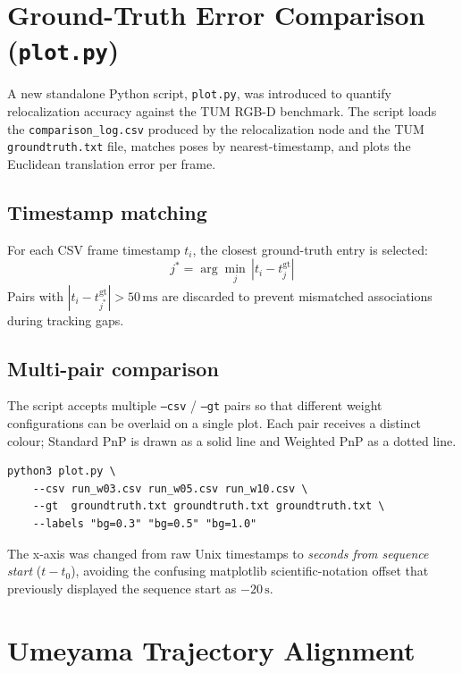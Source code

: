 \documentclass[11pt,a4paper]{article}
\begin{document}
\section{Ground-Truth Error Comparison (\texttt{plot.py})}

A new standalone Python script, \texttt{plot.py}, was introduced to quantify
relocalization accuracy against the TUM RGB-D benchmark. The script loads the
\texttt{comparison\_log.csv} produced by the relocalization node and the TUM
\texttt{groundtruth.txt} file, matches poses by nearest-timestamp, and plots
the Euclidean translation error per frame.

\subsection{Timestamp matching}

For each CSV frame timestamp $t_i$, the closest ground-truth entry is selected:
\[
  j^* = \arg\min_{j}\, |t_i - t^{\text{gt}}_j|
\]
Pairs with $|t_i - t^{\text{gt}}_{j^*}| > 50\,\text{ms}$ are discarded to
prevent mismatched associations during tracking gaps.

\subsection{Multi-pair comparison}

The script accepts multiple \texttt{--csv} / \texttt{--gt} pairs so that
different weight configurations can be overlaid on a single plot. Each pair
receives a distinct colour; Standard PnP is drawn as a solid line and
Weighted PnP as a dotted line.

\begin{lstlisting}[style=python, caption={Multi-pair usage example}]
python3 plot.py \
    --csv run_w03.csv run_w05.csv run_w10.csv \
    --gt  groundtruth.txt groundtruth.txt groundtruth.txt \
    --labels "bg=0.3" "bg=0.5" "bg=1.0"
\end{lstlisting}

The x-axis was changed from raw Unix timestamps to \emph{seconds from sequence
start} ($t - t_0$), avoiding the confusing matplotlib scientific-notation
offset that previously displayed the sequence start as $-20\,\text{s}$.

\section{Umeyama Trajectory Alignment}
\end{document}
